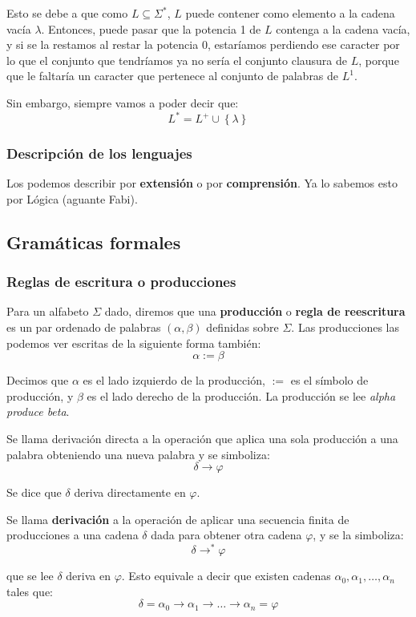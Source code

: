 \documentclass[12pt]{article}
\begin{document}
Esto se debe a que como $ L \subseteq \Sigma^{*} $, $ L $ puede contener como elemento a la cadena vacía $ \lambda $. Entonces, puede pasar que la potencia 1 de $ L $ contenga a la cadena vacía, y si se la restamos al restar la potencia 0, estaríamos perdiendo ese caracter por lo que el conjunto que tendríamos ya no sería el conjunto clausura de $ L $, porque que le faltaría un caracter que pertenece al conjunto de palabras de $ L^{1} $.

Sin embargo, siempre vamos a poder decir que:
\[
	L^{*} = L^{+}\cup \left\{\lambda\right\}
\]

\subsubsection{Descripción de los lenguajes}
Los podemos describir por \textbf{extensión} o por \textbf{comprensión}. Ya lo sabemos esto por Lógica (aguante Fabi).

\subsection{Gramáticas formales}
\subsubsection{Reglas de escritura o producciones}
Para un alfabeto $ \Sigma $ dado, diremos que una \textbf{producción} o \textbf{regla de reescritura} es un par ordenado de palabras $ \left(\alpha, \beta\right) $ definidas sobre $ \Sigma $. Las producciones las podemos ver escritas de la siguiente forma también:
\[
	\alpha := \beta
\]

Decimos que $ \alpha $ es el lado izquierdo de la producción, $ := $ es el símbolo de producción, y $ \beta $ es el lado derecho de la producción. La producción se lee \textit{alpha produce beta}.

Se llama derivación directa a la operación que aplica una sola producción a una palabra obteniendo una nueva palabra y se simboliza:\[
	\delta \to \varphi
\]

Se dice que $ \delta $ deriva directamente en $ \varphi $.

Se llama \textbf{derivación} a la operación de aplicar una secuencia finita de producciones a una cadena $ \delta $ dada para obtener otra cadena $ \varphi $, y se la simboliza:
\[
	\delta \to^{*} \varphi
\]

que se lee $ \delta $ deriva en $ \varphi $. Esto equivale a decir que existen cadenas $ \alpha_{0}, \alpha_{1}, \dots, \alpha_{n} $ tales que:
\[
	\delta = \alpha_{0} \to \alpha_{1} \to \dots \to \alpha_{n} = \varphi
\]
\end{document}
